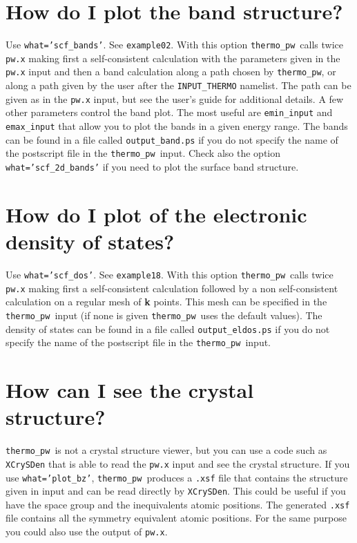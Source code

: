 \documentclass[12pt,a4paper]{article}
\def\thermo{\texttt{thermo\_pw}}
\begin{document}
\section{\color{coral}How do I plot the band structure?}
Use \texttt{what='scf\_bands'}. See \texttt{example02}.
With this option \thermo\ calls twice
\texttt{pw.x} making first a self-consistent calculation with the parameters
given in the \texttt{pw.x} input and then a band calculation along a 
path chosen by \thermo, or along a path given by the user
after the \texttt{INPUT\_THERMO} namelist. The path can be given as
in the \texttt{pw.x} input, but see the user's guide for additional details.
A few other parameters control the band plot. The most useful are 
\texttt{emin\_input} and \texttt{emax\_input} that allow you to plot the 
bands in a given energy range. The bands can be found 
in a file called \texttt{output\_band.ps} if you do not specify the name 
of the postscript file in the \thermo\ input.
Check also the option \texttt{what='scf\_2d\_bands'} if you need
to plot the surface band structure.

\section{\color{coral}How do I plot of the electronic density of states?}
Use \texttt{what='scf\_dos'}. See \texttt{example18}. With this option
\thermo\ calls twice \texttt{pw.x} making first a self-consistent calculation
followed by a non self-consistent calculation on a regular mesh of 
{\bf k} points.
This mesh can be specified in the \thermo\ input (if none is given \thermo\ 
uses the default values). The density of
states can be found in a file called \texttt{output\_eldos.ps} if you do not
specify the name of the postscript file in the \thermo\ input.

\section{\color{coral}How can I see the crystal structure?}
\thermo\ is not a crystal structure viewer, but you can use a code such
as \texttt{XCrySDen} that is able to read the \texttt{pw.x} input and
see the crystal structure. If you use \texttt{what='plot\_bz'}, 
\thermo\ produces a \texttt{.xsf} file that contains the structure given in
input and can be read directly by \texttt{XCrySDen}. This could
be useful if you have the space group and the inequivalents atomic positions.
The generated \texttt{.xsf} file contains all the symmetry equivalent 
atomic positions. For the same purpose you could also use the output
of \texttt{pw.x}.
\end{document}
